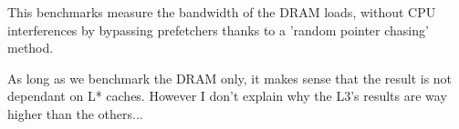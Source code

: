 
This benchmarks measure the bandwidth of the DRAM loads, without CPU interferences by bypassing prefetchers thanks to a 'random pointer chasing' method.

As long as we benchmark the DRAM only, it makes sense that the result is not dependant on L* caches. However I don't explain why the L3's results are way higher than the others...